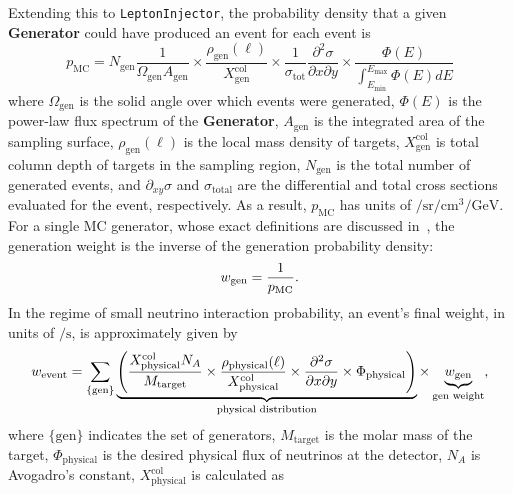 \documentclass[main.tex]{subfiles}
\newcommand{\LeptonInjector}{\texttt{LeptonInjector}}
\begin{document}
Extending this to \LeptonInjector{}, the probability density that a given \textbf{Generator} could have produced an event for each event is
\begin{equation}
p_\mathrm{MC} = N_\textrm{gen}\frac{1}{\Omega_\mathrm{gen} A_\mathrm{gen}} \times
\frac{\rho_\textrm{gen}(\ell)}{X_\textrm{gen}^\textrm{col}} \times \frac{1}{\sigma_\mathrm{tot}}\frac{\partial^2\sigma}{\partial x\partial y}\times \frac{\Phi(E)}{\int_{E_\mathrm{min}}^{E_\mathrm{max}}\Phi(E) dE}
\end{equation}
where $\Omega_{\mathrm{gen}}$ is the solid angle over which events were generated, $\Phi(E)$ is the power-law flux spectrum of the \textbf{Generator}, $A_{\mathrm{gen}}$ is the integrated area of the sampling surface, $\rho_\textrm{gen}(\ell)$ is the local mass density of targets, $X_\textrm{gen}^\mathrm{col}$ is total column depth of targets in the sampling region, $N_{\textrm{gen}}$ is the total number of generated events, and $\partial_{xy}\sigma$ and $\sigma_{\mathrm{total}}$ are the differential and total cross sections evaluated for the event, respectively.
As a result, $p_{\mathrm{MC}}$ has units of $\si{\per\steradian\per\cubic\cm\per\GeV}$.
For a single MC generator, whose exact definitions are discussed in~\cite{Gainer:2014}, the generation weight is the inverse of the generation probability density:
\begin{equation}
w_{\rm gen} = \frac{1}{p_{\mathrm{MC}}}.
\end{equation}
In the regime of small neutrino interaction probability, an event's final weight, in units of $\si{\per\s}$, is approximately given by
\begin{equation}
w_{\rm event} = \sum\limits_{\lbrace \textrm{gen}\rbrace} \underbrace{\left( \frac{X_\textrm{physical}^\mathrm{col} N_{A}}{M_\textrm{target}} \times \frac{\rho_\textrm{physical}(\ell)}{X_\textrm{physical}^\textrm{col}} \times \frac{\partial^2\sigma}{\partial x \partial y} \times\Phi_{\mathrm{physical}} \right) }_{\text{physical distribution}} \times \underbrace{ w_{\mathrm{gen}}}_{\text{gen weight}},
\label{eq:approx_weight}
\end{equation}
where $\{\textrm{gen}\}$ indicates the set of generators, $M_\textrm{target}$ is the molar mass of the target, $\Phi_{\mathrm{physical}}$ is the desired physical flux of neutrinos at the detector, $N_A$ is Avogadro's constant, $X_\textrm{physical}^\textrm{col}$ is calculated as
\end{document}
